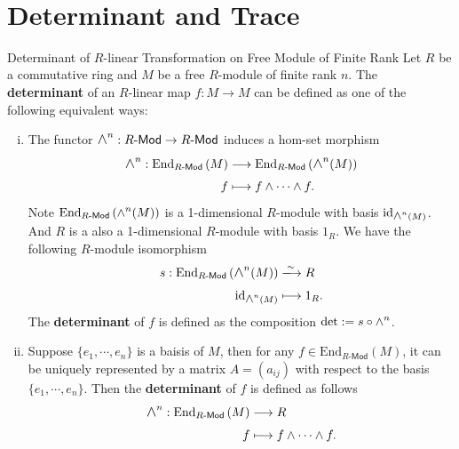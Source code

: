 \

\section{Determinant and Trace}



\begin{definition}{Determinant of $R$-linear Transformation on Free Module of Finite Rank}{}
    Let $R$ be a commutative ring and $M$ be a free $R$-module of finite rank $n$. The \textbf{determinant} of an $R$-linear map $f:M\to M$ can be defined as one of the following equivalent ways:
    \begin{enumerate}[(i)]
        \item The functor $\Largewedge^n:R\text{-}\mathsf{Mod}\to R\text{-}\mathsf{Mod}$ induces a hom-set morphism 
        \begin{align*}
            \largewedge^n:\mathrm{End}_{R\text{-}\mathsf{Mod}}\left(M\right) &\longrightarrow\mathrm{End}_{R\text{-}\mathsf{Mod}}\left(\largewedge^n(M)\right)\\
        f &\longmapsto f\wedge\cdots\wedge f.
        \end{align*}
        Note $\mathrm{End}_{R\text{-}\mathsf{Mod}}\left(\largewedge^n(M)\right)$ is a 1-dimensional $R$-module with basis $\mathrm{id}_{\largewedge^n(M)}$. And $R$ is a also a 1-dimensional $R$-module with basis $1_R$. We have the following $R$-module isomorphism
        \begin{align*}
            s:\mathrm{End}_{R\text{-}\mathsf{Mod}}\left(\largewedge^n(M)\right)&\xlongrightarrow{\sim} R\\
            \mathrm{id}_{\largewedge^n(M)} &\longmapsto 1_R.
        \end{align*}
        The \textbf{determinant} of $f$ is defined as the composition $\det:=s\circ \largewedge^n$.
        \item Suppose $\{e_1,\cdots,e_n\}$ is a baisis of $M$, then for any $f\in \mathrm{End}_{R\text{-}\mathsf{Mod}}\left(M\right)$, it can be uniquely represented by a matrix $A=(a_{ij})$ with respect to the basis $\{e_1,\cdots,e_n\}$. Then the \textbf{determinant} of $f$ is defined as follows
        \begin{align*}
            \largewedge^n:\mathrm{End}_{R\text{-}\mathsf{Mod}}\left(M\right) &\longrightarrow R\\
        f &\longmapsto f\wedge\cdots\wedge f.
        \end{align*}
    \end{enumerate}
\end{definition}

